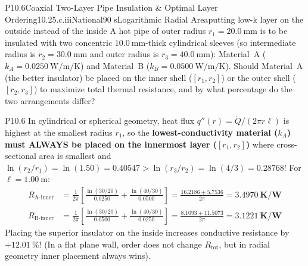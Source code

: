 \begin{problem}{P10.6}{Coaxial Two-Layer Pipe Insulation \& Optimal Layer Ordering}{10.2}{5.c.iii}{National}{90 s}{Logarithmic Radial Area}{putting low-k layer on the outside instead of the inside}
A hot pipe of outer radius $r_1 = \SI{20.0}{\milli\meter}$ is to be insulated with two concentric $\SI{10.0}{\milli\meter}$-thick cylindrical sleeves (so intermediate radius is $r_2 = \SI{30.0}{\milli\meter}$ and outer radius is $r_3 = \SI{40.0}{\milli\meter}$): Material~A ($k_A = \SI{0.0250}{\watt\per\meter\per\kelvin}$) and Material~B ($k_B = \SI{0.0500}{\watt\per\meter\per\kelvin}$). Should Material~A (the better insulator) be placed on the inner shell ($[r_1, r_2]$) or the outer shell ($[r_2, r_3]$) to maximize total thermal resistance, and by what percentage do the two arrangements differ?
\end{problem}
\begin{solution}{P10.6}
In cylindrical or spherical geometry, heat flux $q''(r) = \dot{Q}/(2\pi r \ell)$ is highest at the smallest radius $r_1$, so the \textbf{lowest-conductivity material ($k_A$) must ALWAYS be placed on the innermost layer ($[r_1, r_2]$)} where cross-sectional area is smallest and $\ln(r_2/r_1) = \ln(1.50) = 0.40547 > \ln(r_3/r_2) = \ln(4/3) = 0.28768$! For $\ell = \SI{1.00}{\meter}$:
\begin{align*}
  R_{\mathrm{A\text{-}inner}} &= \frac{1}{2\pi}\!\left[\frac{\ln(30/20)}{0.0250} + \frac{\ln(40/30)}{0.0500}\right] = \frac{16.2186 + 5.7536}{2\pi} = \mathbf{\SI{3.4970}{\kelvin\per\watt}} \\
  R_{\mathrm{B\text{-}inner}} &= \frac{1}{2\pi}\!\left[\frac{\ln(30/20)}{0.0500} + \frac{\ln(40/30)}{0.0250}\right] = \frac{8.1093 + 11.5073}{2\pi} = \mathbf{\SI{3.1221}{\kelvin\per\watt}}
\end{align*}
Placing the superior insulator on the inside increases conductive resistance by $+\SI{12.01}{\percent}$! (In a flat plane wall, order does not change $R_{\mathrm{tot}}$, but in radial geometry inner placement always wins).
\end{solution}

